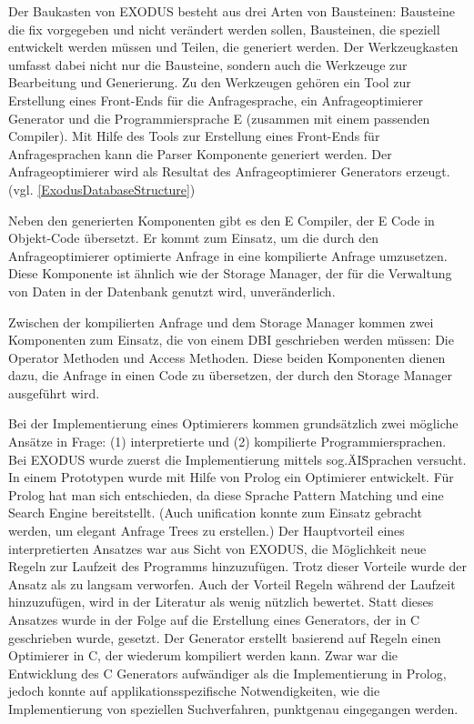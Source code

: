 Der Baukasten von EXODUS besteht aus drei Arten von Bausteinen: Bausteine die fix vorgegeben und nicht verändert werden sollen, Bausteinen, die speziell entwickelt werden müssen und Teilen, die generiert werden. Der Werkzeugkasten umfasst dabei nicht nur die Bausteine, sondern auch die Werkzeuge zur Bearbeitung und Generierung. Zu den Werkzeugen gehören ein Tool zur Erstellung eines Front-Ends für die Anfragesprache, ein Anfrageoptimierer Generator und die Programmiersprache E (zusammen mit einem passenden Compiler). Mit Hilfe des Tools zur Erstellung eines Front-Ends für Anfragesprachen kann die Parser Komponente generiert werden. Der Anfrageoptimierer wird als Resultat des Anfrageoptimierer Generators erzeugt. (vgl. \ref{ExodusDatabaseStructure})

Neben den generierten Komponenten gibt es den E Compiler, der E Code in Objekt-Code übersetzt. Er kommt zum Einsatz, um die durch den Anfrageoptimierer optimierte Anfrage in eine kompilierte Anfrage umzusetzen. Diese Komponente ist ähnlich wie der Storage Manager, der für die Verwaltung von Daten in der Datenbank genutzt wird, unveränderlich. 

Zwischen der kompilierten Anfrage und dem Storage Manager kommen zwei Komponenten zum Einsatz, die von einem DBI geschrieben werden müssen: Die Operator Methoden und Access Methoden. Diese beiden Komponenten dienen dazu, die Anfrage in einen Code zu übersetzen, der durch den  Storage Manager ausgeführt wird.

Bei der Implementierung eines Optimierers kommen grundsätzlich zwei mögliche Ansätze in Frage: (1) interpretierte und (2) kompilierte Programmiersprachen. Bei EXODUS wurde zuerst die Implementierung mittels sog.\"AI\" Sprachen versucht. In einem Prototypen wurde mit Hilfe von Prolog ein Optimierer entwickelt. Für Prolog hat man sich entschieden, da diese Sprache Pattern Matching und eine Search Engine bereitstellt. (Auch unification konnte zum Einsatz gebracht werden, um elegant Anfrage Trees zu erstellen.) Der Hauptvorteil eines interpretierten Ansatzes war aus Sicht von EXODUS, die Möglichkeit neue Regeln zur Laufzeit des Programms hinzuzufügen. Trotz dieser Vorteile wurde der Ansatz als zu langsam verworfen. Auch der Vorteil Regeln während der Laufzeit hinzuzufügen, wird in der Literatur  als wenig nützlich bewertet. Statt dieses Ansatzes wurde in der Folge auf die Erstellung eines Generators, der in C geschrieben wurde, gesetzt. Der Generator erstellt basierend auf Regeln einen Optimierer in C, der wiederum kompiliert werden kann. Zwar war die Entwicklung des C Generators aufwändiger als die Implementierung in Prolog, jedoch konnte auf applikationsspezifische Notwendigkeiten, wie die Implementierung von speziellen Suchverfahren, punktgenau eingegangen werden.


